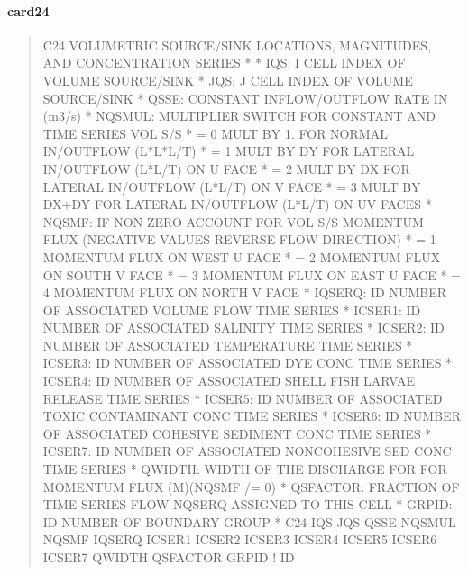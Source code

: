 \documentclass[letterpaper,10pt,english]{sphinxmanual}
\begin{document}
\paragraph{card24}
\label{\detokenize{inputfiles/runcontrol/card24:card24}}\label{\detokenize{inputfiles/runcontrol/card24::doc}}\begin{quote}

\begin{sphinxVerbatim}[commandchars=\\\{\}]
\PYGZhy{}\PYGZhy{}\PYGZhy{}\PYGZhy{}\PYGZhy{}\PYGZhy{}\PYGZhy{}\PYGZhy{}\PYGZhy{}\PYGZhy{}\PYGZhy{}\PYGZhy{}\PYGZhy{}\PYGZhy{}\PYGZhy{}\PYGZhy{}\PYGZhy{}\PYGZhy{}\PYGZhy{}\PYGZhy{}\PYGZhy{}\PYGZhy{}\PYGZhy{}\PYGZhy{}\PYGZhy{}\PYGZhy{}\PYGZhy{}\PYGZhy{}\PYGZhy{}\PYGZhy{}\PYGZhy{}\PYGZhy{}\PYGZhy{}\PYGZhy{}\PYGZhy{}\PYGZhy{}\PYGZhy{}\PYGZhy{}\PYGZhy{}\PYGZhy{}\PYGZhy{}\PYGZhy{}\PYGZhy{}\PYGZhy{}\PYGZhy{}\PYGZhy{}\PYGZhy{}\PYGZhy{}\PYGZhy{}\PYGZhy{}\PYGZhy{}\PYGZhy{}\PYGZhy{}\PYGZhy{}\PYGZhy{}\PYGZhy{}\PYGZhy{}\PYGZhy{}\PYGZhy{}\PYGZhy{}\PYGZhy{}\PYGZhy{}\PYGZhy{}\PYGZhy{}\PYGZhy{}\PYGZhy{}\PYGZhy{}\PYGZhy{}\PYGZhy{}\PYGZhy{}\PYGZhy{}\PYGZhy{}\PYGZhy{}\PYGZhy{}\PYGZhy{}\PYGZhy{}\PYGZhy{}\PYGZhy{}
C24 VOLUMETRIC SOURCE/SINK LOCATIONS, MAGNITUDES, AND CONCENTRATION SERIES
*
*  IQS:      I CELL INDEX OF VOLUME SOURCE/SINK
*  JQS:      J CELL INDEX OF VOLUME SOURCE/SINK
*  QSSE:     CONSTANT INFLOW/OUTFLOW RATE IN (m\PYGZca{}3/s)
*  NQSMUL:   MULTIPLIER SWITCH FOR CONSTANT AND TIME SERIES VOL S/S
*            = 0  MULT BY 1. FOR NORMAL IN/OUTFLOW (L*L*L/T)
*            = 1  MULT BY DY FOR LATERAL IN/OUTFLOW (L*L/T) ON U FACE
*            = 2  MULT BY DX FOR LATERAL IN/OUTFLOW (L*L/T) ON V FACE
*            = 3  MULT BY DX+DY FOR LATERAL IN/OUTFLOW (L*L/T) ON U\PYGZam{}V FACES
*  NQSMF:   IF NON ZERO ACCOUNT FOR VOL S/S MOMENTUM FLUX (NEGATIVE VALUES REVERSE FLOW DIRECTION)
*            = 1  MOMENTUM FLUX ON WEST U FACE
*            = 2  MOMENTUM FLUX ON SOUTH V FACE
*            = 3  MOMENTUM FLUX ON EAST U FACE
*            = 4  MOMENTUM FLUX ON NORTH V FACE
*  IQSERQ:   ID NUMBER OF ASSOCIATED VOLUME FLOW TIME SERIES
*  ICSER1:   ID NUMBER OF ASSOCIATED SALINITY TIME SERIES
*  ICSER2:   ID NUMBER OF ASSOCIATED TEMPERATURE TIME SERIES
*  ICSER3:   ID NUMBER OF ASSOCIATED DYE CONC TIME SERIES
*  ICSER4:   ID NUMBER OF ASSOCIATED SHELL FISH LARVAE RELEASE TIME SERIES
*  ICSER5:   ID NUMBER OF ASSOCIATED TOXIC CONTAMINANT CONC TIME SERIES
*  ICSER6:   ID NUMBER OF ASSOCIATED COHESIVE SEDIMENT CONC TIME SERIES
*  ICSER7:   ID NUMBER OF ASSOCIATED NON\PYGZhy{}COHESIVE SED CONC TIME SERIES
*  QWIDTH:   WIDTH OF THE DISCHARGE FOR FOR MOMENTUM FLUX (M)(NQSMF /= 0)
*  QSFACTOR: FRACTION OF TIME SERIES FLOW NQSERQ ASSIGNED TO THIS CELL
*  GRPID:    ID NUMBER OF BOUNDARY GROUP
*
C24     IQS     JQS        QSSE  NQSMUL   NQSMF  IQSERQ  ICSER1  ICSER2  ICSER3  ICSER4  ICSER5  ICSER6  ICSER7   QWIDTH    QSFACTOR    GRPID ! ID
\end{sphinxVerbatim}
\end{quote}
\end{document}

